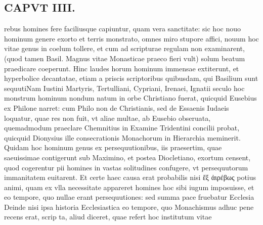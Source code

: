 \documentclass{article}
\begin{document}
\begin{pages}
\section*{CAPVT  IIII. }
\marginpar{[ p.215 ]}\pstart rebus homines fere faciliusque capiuntur, quam vera sanctitate: sic hoc nouo hominum genere exorto et terris monstrato, omnes miro stupore affici, nouum hoc vitae genus in coelum tollere, et cum ad scripturae regulam non examinarent, (quod tamen Basil. Magnus vitae Monasticae praeco fieri vult) solum beatum praedicare coeperunt. Hinc laudes horum hominum immensae extiterunt, et hyperbolice decantatae, etiam a priscis scriptoribus quibusdam, qui Basilium sunt sequutiNam Iustini Martyris, Tertulliani, Cypriani, Irenaei, Ignatii seculo hoc monstrum hominum nondum natum in orbe Christiano fuerat, quicquid Eusebius ex Philone narret: cum Philo non de Christianis, sed de Essaenis Iudaeis loquatur, quae res non fuit, vt aliae multae, ab Eusebio obseruata, quemadmodum praeclare Chemnitius in Examine Tridentini concilii probat, quicquid Dionysius ille consecrationis Monachorum in Hierarchia meminerit. Quidam hoc hominum genus ex persequutionibus, iis praesertim, quae saeuissimae contigerunt sub Maximino, et postea Diocletiano, exortum censent, quod cogerentur pii homines in vastas solitudines confugere, vt persequutorum immanitatem euitarent. Et certe haec causa erat probabilis nisi ἔξ ἀιρέβως potius animi, quam ex vlla necessitate appareret homines hoc sibi iugum imposuisse, et eo tempore, quo nullae erant persequutiones: sed summa pace fruebatur Ecclesia Deinde nisi ipsa historia Ecclesiastica eo tempore, quo Monachismus adhuc pene recens erat, scrip ta, aliud diceret, quae refert hoc institutum vitae  \pend

\end{pages}
\end{document}
